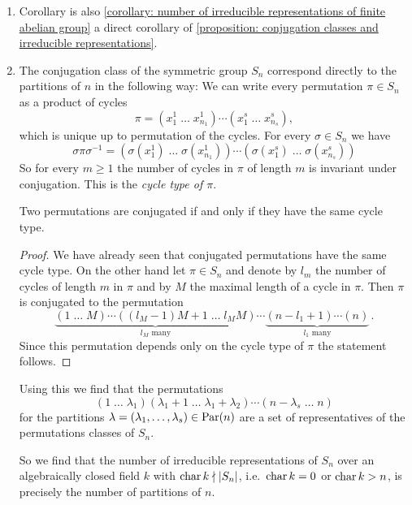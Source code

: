 \begin{example}
  \begin{enumerate}[label=\emph{\alph*)}, leftmargin=*]
    \item
      Corollary is also \ref{corollary: number of irreducible representations of finite abelian group} a direct corollary of \ref{proposition: conjugation classes and irreducible representations}.
    \item
      The conjugation class of the symmetric group $S_n$ correspond directly to the partitions of $n$ in the following way:
      We can write every permutation $\pi \in S_n$ as a product of cycles
      \[
          \pi
        =         \left( x^1_1 \; \dots \; x^1_{n_1} \right)
          \dotsm  \left(x^s_1 \; \dots \; x^s_{n_s} \right),
      \]
      which is unique up to permutation of the cycles. For every $\sigma \in S_n$ we have
      \[
          \sigma \pi \sigma^{-1}
        =         \left(
                        \sigma\left( x^1_1 \right)
                    \;  \dotso
                    \;  \sigma\left( x^1_{n_1} \right)
                  \right)
          \dotsm  \left(
                        \sigma\left( x^s_1 \right)
                    \;  \dotso
                    \;  \sigma\left( x^s_{n_s} \right)
                  \right)
      \]
      So for every $m \geq 1$ the number of cycles in $\pi$ of length $m$ is invariant under conjugation.
      This is the \emph{cycle type of $\pi$}.
      
      \begin{claim}
        Two permutations are conjugated if and only if they have the same cycle type.
      \end{claim}
      \begin{proof}
        We have already seen that conjugated permutations have the same cycle type.
        On the other hand let $\pi \in S_n$ and denote by $l_m$ the number of cycles of length $m$ in $\pi$ and by $M$ the maximal length of a cycle in $\pi$.
        Then $\pi$ is conjugated to the permutation
        \[
                  \underbrace{ (1 \; \dots \; M) \dotsm ((l_M-1)M+1 \; \dots \; l_M M) }_{ \text{$l_M$ many} }
          \dotsm  \underbrace{ (n-l_1+1) \dotsm (n) }_{ \text{$l_1$ many} } \,.
        \]
        Since this permutation depends only on the cycle type of $\pi$ the statement follows.
      \end{proof}
      
      Using this we find that the permutations
      \[
                (1 \; \dotso \; \lambda_1)
                (\lambda_1 + 1 \; \dotso \; \lambda_1 + \lambda_2)
        \dotsm  (n-\lambda_s \; \dots \; n)
      \]
      for the partitions $\lambda = (\lambda_1, \dotsc, \lambda_s) \in \operatorname{Par}(n)$ are a set of representatives of the permutations classes of $S_n$.
      
      So we find that the number of irreducible representations of $S_n$ over an algebraically closed field $k$ with $\operatorname{char} k \nmid |S_n|$, i.e.\ $\operatorname{char} k = 0$ or $\operatorname{char} k > n$, is precisely the number of partitions of $n$.
  \end{enumerate}
\end{example}


